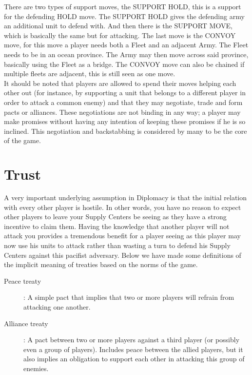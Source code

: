 \documentclass[a4paper]{article} %
\begin{document}
There are two types of support moves, the SUPPORT HOLD, this is a support for the defending HOLD move. The SUPPORT HOLD gives the defending army an additional unit to defend with. And then there is the SUPPORT MOVE, which is basically the same but for attacking. The last move is the CONVOY move, for this move a player needs both a Fleet and an adjacent Army. The Fleet needs to be in an ocean province. The Army may then move across said province, basically using the Fleet as a bridge.
The CONVOY move can also be chained if multiple fleets are adjacent, this is still seen as one move.
\\It should be noted that players are allowed to spend their moves helping each other out (for instance, by supporting a unit that belongs to a different player in order to attack a common enemy) and that they may negotiate, trade and form pacts or alliances. These negotiations are not binding in any way; a player may make promises without having any intention of keeping these promises if he is so inclined. This negotiation and backstabbing is considered by many to be the core of the game.

\section{Trust}


A very important underlying assumption in Diplomacy is that the initial relation with every other player is hostile. In other words, you have no reason to expect other players to leave your Supply Centers be seeing as they have a strong incentive to claim them. Having the knowledge that another player will not attack you provides a tremendous benefit for a player seeing as this player may now use his units to attack rather than wasting a turn to defend his Supply Centers against this pacifist adversary. Below we have made some definitions of the implicit meaning of treaties based on the norms of the game.
\begin{description}
\item[Peace treaty]: A simple pact that implies that two or more players will refrain from attacking one another.

\item[Alliance treaty]: A pact between two or more players against a third player (or possibly even a group of players). Includes peace between the allied players, but it also implies an obligation to support each other in attacking this group of enemies.
\end{description}
\end{document}
